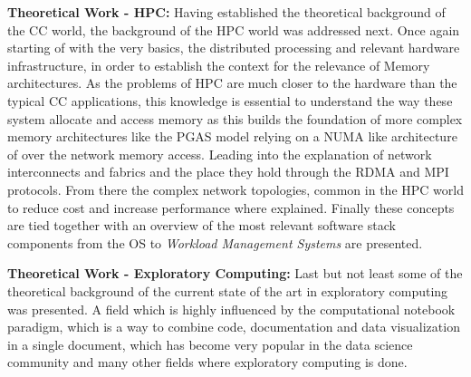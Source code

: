 \textbf{Theoretical Work - HPC:} Having established the theoretical background of the \ac{CC} world,
the background of the \ac{HPC} world was addressed next.
Once again starting of with the very basics, the distributed processing and relevant
hardware infrastructure, in order to establish the context for the relevance of Memory architectures.
As the problems of \ac{HPC} are much closer to the hardware than the typical \ac{CC} applications,
this knowledge is essential to understand the way these system allocate and access memory as this
builds the foundation of more complex memory architectures like the \ac{PGAS} model relying
on a \ac{NUMA} like architecture of over the network memory access.
Leading into the explanation of network interconnects and fabrics and the place
they hold through the \ac{RDMA} and \ac{MPI} protocols.
From there the complex network topologies, common in the \ac{HPC} world to reduce cost and
increase performance where explained.
Finally these concepts are tied together with an overview of the most relevant software stack components
from the \ac{OS} to \textit{Workload Management Systems} are presented.


\textbf{Theoretical Work - Exploratory Computing:} Last but not least some of the theoretical background of
the current state of the art in exploratory computing was presented.
A field which is highly influenced by the computational notebook paradigm,
which is a way to combine code, documentation and data visualization in a single document,
which has become very popular in the data science community and
many other fields where exploratory computing is done.



